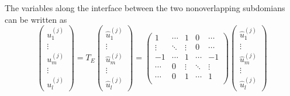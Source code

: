 The variables along the interface between the two nonoverlapping subdomians can be written as
\begin{equation}
\begin{pmatrix}
u_{1}^{(j)} \\ \vdots \\ u_{m}^{(j)} \\ \vdots \\ u_{l}^{(j)}
\end{pmatrix} = T_{E} \begin{pmatrix}
\hat{u}_{1}^{(j)} \\ \vdots \\ \hat{u}_{m}^{(j)} \\ \vdots \\ \hat{u}_{l}^{(j)}
\end{pmatrix} = \begin{pmatrix}
1 & \cdots & 1 & 0 & \cdots \\
\vdots & \ddots & \vdots & 0 & \cdots \\
-1 & \cdots & 1 & \cdots & -1 \\
\cdots & 0 & \vdots & \ddots &  \vdots \\
\cdots & 0 & 1 & \cdots & 1\\
\end{pmatrix} \begin{pmatrix}
\hat{u}_{1}^{(j)} \\ \vdots \\ \hat{u}_{m}^{(j)} \\ \vdots \\ \hat{u}_{l}^{(j)}
\end{pmatrix}
\end{equation}

